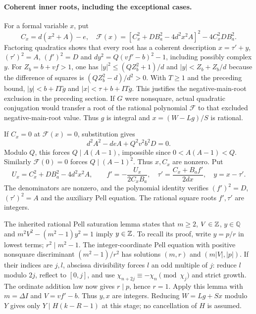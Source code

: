 \paragraph{Coherent inner roots, including the exceptional cases.}
For a formal variable $x$, put
\[
 C_x=d(x^2+A)-e,\quad
 \mathcal F(x)=[C_x^2+DB_a^2-4d^2x^2A]^2-4C_x^2DB_a^2.
\]
Factoring quadratics shows that every root has a coherent description
$x=\tau'+y$, $(\tau')^2=A$, $(f')^2=D$ and
$dy^2=Q(vf'-b)^2-1$, including possibly complex $y$.
For $Z_b=b+vf>1$, one has
$|y|^2\le(QZ_b^2+1)/d$ and $|y|<Z_b+Z_b/d$ because the difference of
squares is $(QZ_b^2-d)/d^2>0$. With $T\ge1$ and the preceding bound,
$|y|<b+ITg$ and $|x|<\tau+b+ITg$. This justifies the negative-main-root
exclusion in the preceding section. If $G$ were nonsquare, actual quadratic
conjugation would transfer a root of the rational polynomial $\mathcal F$
to that excluded negative-main-root value. Thus $g$ is integral and
$x=(W-Lg)/S$ is rational.

If $C_x=0$ at $\mathcal F(x)=0$, substitution gives
\[
 d^2A^2-deA+Q^2v^2b^2D=0.
\]
Modulo $Q$, this forces $Q\mid A(A-1)$, impossible since
$0<A(A-1)<Q$. Similarly $\mathcal F(0)=0$ forces $Q\mid(A-1)^2$.
Thus $x,C_x$ are nonzero. Put
\[
 U_x=C_x^2+DB_a^2-4d^2x^2A,\qquad
 f'=-\frac{U_x}{2C_xB_a},\quad
 \tau'=\frac{C_x+B_af'}{2dx},\quad y=x-\tau'.
\]
The denominators are nonzero, and the polynomial identity verifies
$(f')^2=D$, $(\tau')^2=A$ and the auxiliary Pell equation. The rational
square roots $f',\tau'$ are integers.

The inherited rational Pell saturation lemma states that $m\ge2$, $V\in\mathbb Z$,
$y\in\mathbb Q$ and $m^2V^2-(m^2-1)y^2=1$ imply $y\in\mathbb Z$.
To recall its proof, write $y=p/r$ in lowest terms; $r^2\mid m^2-1$.
The integer-coordinate Pell equation with positive nonsquare discriminant
$(m^2-1)/r^2$ has solutions $(m,r)$ and $(m|V|,|p|)$. If their indices
are $j,l$, abscissa divisibility forces $l$ an odd multiple of $j$:
reduce $l$ modulo $2j$, reflect to $[0,j]$, and use
$\chi_{n+2j}\equiv-\chi_n\pmod{\chi_j}$ and strict growth.
The ordinate addition law now gives $r\mid p$, hence $r=1$.
Apply this lemma with $m=\Delta I$ and $V=vf'-b$.
Thus $y,x$ are integers. Reducing $W=Lg+Sx$ modulo $Y$ gives only
$Y\mid H(k-R-1)$ at this stage; no cancellation of $H$ is assumed.

